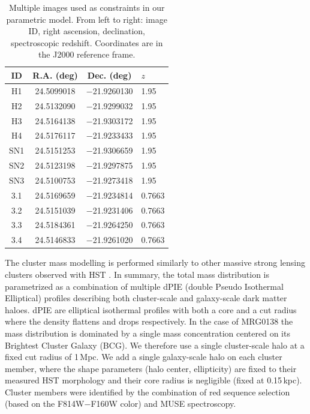 \documentclass[12pt]{article}
\begin{document}
\begin{table}[ht]
    \centering
    \begin{tabular}{cccl}
     ID &   R.A. (deg) & Dec. (deg) & $z$ \\
     \midrule
H1 & 24.5099018 & $-$21.9260130 & 1.95 \\
H2 & 24.5132090 & $-$21.9299032 & 1.95 \\
H3 & 24.5164138 & $-$21.9303172 & 1.95 \\
H4 & 24.5176117 & $-$21.9233433 & 1.95 \\
     \midrule
SN1 & 24.5151253 & $-$21.9306659 & 1.95 \\
SN2 & 24.5123198 & $-$21.9297875 & 1.95 \\
SN3 & 24.5100753 & $-$21.9273418 & 1.95 \\
     \midrule
3.1 & 24.5169659 & $-$21.9234814 & 0.7663 \\
3.2 & 24.5151039 & $-$21.9231406 & 0.7663 \\
3.3 & 24.5184361 & $-$21.9264250 & 0.7663 \\
3.4 & 24.5146833 & $-$21.9261020 & 0.7663 \\
    \end{tabular}
    \caption{Multiple images used as constraints in our parametric model. From left to right: image ID, right ascension, declination, spectroscopic redshift.  Coordinates are in the J2000 reference frame.}
    \label{tab:mulimages}
\end{table}

The cluster mass modelling is performed similarly to other massive strong lensing clusters observed with HST \cite{richard_mass_2014}. In summary, the total mass distribution is parametrized as a combination of multiple dPIE (double Pseudo Isothermal Elliptical) profiles describing both cluster-scale and galaxy-scale dark matter haloes. dPIE are elliptical isothermal profiles with both a core and a cut radius where the density flattens and drops respectively. In the case of MRG0138 the mass distribution is dominated by a single mass concentration centered on its Brightest Cluster Galaxy (BCG). We therefore use a single cluster-scale halo at a fixed cut radius of 1\,Mpc.  We add a single galaxy-scale halo on each cluster member, where the shape parameters (halo center, ellipticity) are fixed to their measured HST morphology and their core radius is negligible (fixed at 0.15\,kpc). Cluster members were identified by the combination of red sequence selection (based on the F814W$-$F160W color) and MUSE spectroscopy.
\end{document}

